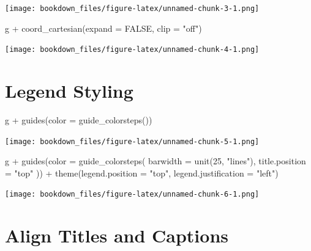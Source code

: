 \documentclass[
]{krantz}
\makeatletter
\newenvironment{Shaded}{\begin{snugshade}}{\end{snugshade}}
\newcommand{\AttributeTok}[1]{\textcolor[rgb]{0.61,0.61,0.61}{#1}}
\newcommand{\ConstantTok}[1]{\textcolor[rgb]{0,0,0}{#1}}
\newcommand{\DecValTok}[1]{\textcolor[rgb]{0.06,0.06,0.06}{#1}}
\newcommand{\FunctionTok}[1]{\textcolor[rgb]{0,0,0}{#1}}
\newcommand{\NormalTok}[1]{#1}
\newcommand{\SpecialCharTok}[1]{\textcolor[rgb]{0,0,0}{#1}}
\newcommand{\StringTok}[1]{\textcolor[rgb]{0.5,0.5,0.5}{#1}}
\newenvironment{kframe}{%
\medskip{}
\setlength{\fboxsep}{.8em}
 \def\at@end@of@kframe{}%
 \ifinner\ifhmode%
  \def\at@end@of@kframe{\end{minipage}}%
  \begin{minipage}{\columnwidth}%
 \fi\fi%
 \def\FrameCommand##1{\hskip\@totalleftmargin \hskip-\fboxsep
 \colorbox{shadecolor}{##1}\hskip-\fboxsep
     \hskip-\linewidth \hskip-\@totalleftmargin \hskip\columnwidth}%
 \MakeFramed {\advance\hsize-\width
   \@totalleftmargin\z@ \linewidth\hsize
   \@setminipage}}%
 {\par\unskip\endMakeFramed%
 \at@end@of@kframe}
\renewenvironment{Shaded}{\begin{kframe}}{\end{kframe}}
\makeatother
\begin{document}
\texttt{[image: bookdown\_files/figure-latex/unnamed-chunk-3-1.png]}

\begin{Shaded}
\begin{Highlighting}[]
\NormalTok{g }\SpecialCharTok{+} \FunctionTok{coord\_cartesian}\NormalTok{(}\AttributeTok{expand =} \ConstantTok{FALSE}\NormalTok{, }\AttributeTok{clip =} \StringTok{"off"}\NormalTok{)}
\end{Highlighting}
\end{Shaded}

\texttt{[image: bookdown\_files/figure-latex/unnamed-chunk-4-1.png]}

\hypertarget{legend-styling-1}{%
\section{Legend Styling}\label{legend-styling-1}}

\begin{Shaded}
\begin{Highlighting}[]
\NormalTok{g }\SpecialCharTok{+} \FunctionTok{guides}\NormalTok{(}\AttributeTok{color =} \FunctionTok{guide\_colorsteps}\NormalTok{())}
\end{Highlighting}
\end{Shaded}

\texttt{[image: bookdown\_files/figure-latex/unnamed-chunk-5-1.png]}

\begin{Shaded}
\begin{Highlighting}[]
\NormalTok{g }\SpecialCharTok{+} \FunctionTok{guides}\NormalTok{(}\AttributeTok{color =} \FunctionTok{guide\_colorsteps}\NormalTok{(}
    \AttributeTok{barwidth =} \FunctionTok{unit}\NormalTok{(}\DecValTok{25}\NormalTok{, }\StringTok{"lines"}\NormalTok{), }\AttributeTok{title.position =} \StringTok{"top"}
\NormalTok{  )) }\SpecialCharTok{+}
  \FunctionTok{theme}\NormalTok{(}\AttributeTok{legend.position =} \StringTok{"top"}\NormalTok{, }\AttributeTok{legend.justification =} \StringTok{"left"}\NormalTok{)}
\end{Highlighting}
\end{Shaded}

\texttt{[image: bookdown\_files/figure-latex/unnamed-chunk-6-1.png]}

\hypertarget{align-titles-and-captions-1}{%
\section{Align Titles and Captions}\label{align-titles-and-captions-1}}
\end{document}
